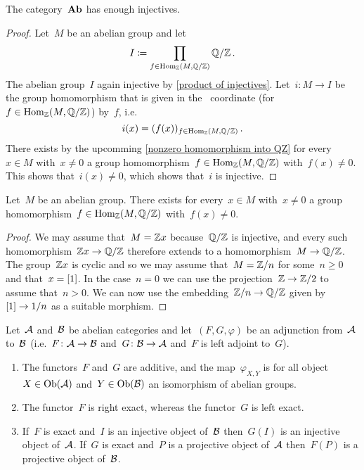 \begin{corollary}
  \label{Ab has enough injectives}
  The category~$\mathbf{Ab}$ has enough injectives.
\end{corollary}


\begin{proof}
  Let~$M$ be an abelian group and let
  \[
    I
    \coloneqq
    \prod_{f \in \operatorname{Hom}_{\mathbb{Z}}(M, \mathbb{Q}/\mathbb{Z})} \mathbb{Q}/\mathbb{Z} \,.
  \]
  The abelian group~$I$ again injective by \cref{product of injectives}.
  Let~$i \colon M \to I$ be the group homomorphism that is given in the~ coordinate (for~$f \in \operatorname{Hom}_{\mathbb{Z}}(M, \mathbb{Q}/\mathbb{Z})$) by~$f$, i.e.
  \[
    i(x)
    =
    ( f(x) )_{f \in \operatorname{Hom}_{\mathbb{Z}}(M, \mathbb{Q}/\mathbb{Z})} \,.
  \]
  There exists by the upcomming \cref{nonzero homomorphism into QZ} for every~$x \in M$ with~$x \neq 0$ a group homomorphism~$f \in \operatorname{Hom}_{\mathbb{Z}}(M, \mathbb{Q}/\mathbb{Z})$ with~$f(x) \neq 0$.
  This shows that~$i(x) \neq 0$, which shows that~$i$ is injective.
\end{proof}


\begin{lemma}
  \label{nonzero homomorphism into QZ}
  Let~$M$ be an abelian group.
  There exists for every~$x \in M$ with~$x \neq 0$ a group homomorphism~$f \in \operatorname{Hom}_{\mathbb{Z}}(M, \mathbb{Q}/\mathbb{Z})$ with~$f(x) \neq 0$.
\end{lemma}


\begin{proof}
  We may assume that~$M = \mathbb{Z} x$ because~$\mathbb{Q}/\mathbb{Z}$ is injective, and every such homomorphism~$\mathbb{Z} x \to \mathbb{Q}/\mathbb{Z}$ therefore extends to a homomorphism~$M \to \mathbb{Q}/\mathbb{Z}$.
  The group~$\mathbb{Z} x$ is cyclic and so we may assume that~$M = \mathbb{Z}/n$ for some~$n \geq 0$ and that~$x = [1]$.
  In the case~$n = 0$ we can use the projection~$\mathbb{Z} \to \mathbb{Z}/2$  to assume that~$n > 0$.
  We can now use the embedding~$\mathbb{Z}/n \to \mathbb{Q}/\mathbb{Z}$ given by~$[1] \to 1/n$ as a suitable morphism.
\end{proof}


\begin{theorem}
  \label{adjunctions between abelian categories}
  Let~$\mathcal{A}$ and~$\mathcal{B}$ be abelian categories and let~$(F, G, \varphi)$ be an adjunction from~$\mathcal{A}$ to~$\mathcal{B}$
  (i.e.~$F \colon \mathcal{A} \to \mathcal{B}$ and~$G \colon \mathcal{B} \to \mathcal{A}$ and~$F$ is left adjoint to~$G$).
  \begin{enumerate}
    \item
      The functors~$F$ and~$G$ are additive, and the map~$\varphi_{X,Y}$ is for all object~$X \in \operatorname{Ob}(\mathcal{A})$ and~$Y \in \operatorname{Ob}(\mathcal{B})$ an isomorphism of abelian groups.
    \item
      The functor~$F$ is right exact, whereas the functor~$G$ is left exact.
    \item
      \label{exact preserve inj and proj}
      If~$F$ is exact and~$I$ is an injective object of~$\mathcal{B}$ then~$G(I)$ is an injective object of~$\mathcal{A}$.
      If~$G$ is exact and~$P$ is a projective object of~$\mathcal{A}$ then~$F(P)$ is a projective object of~$\mathcal{B}$.
  \end{enumerate}
\end{theorem}


